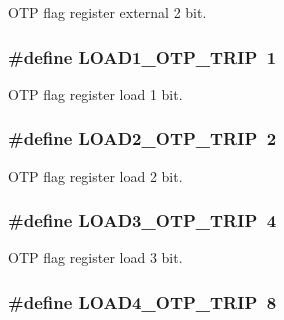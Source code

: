O\-T\-P flag register external 2 bit. \hypertarget{a00034_a720054d07475f46293498641ca147dec}{
\subsubsection[{L\-O\-A\-D1\-\_\-\-O\-T\-P\-\_\-\-T\-R\-I\-P}]{\setlength{\rightskip}{0pt plus 5cm}\#define L\-O\-A\-D1\-\_\-\-O\-T\-P\-\_\-\-T\-R\-I\-P~1}}\label{a00034_a720054d07475f46293498641ca147dec}
O\-T\-P flag register load 1 bit. \hypertarget{a00034_a6a57d6c23509cd22be3a64fc25867f08}{
\subsubsection[{L\-O\-A\-D2\-\_\-\-O\-T\-P\-\_\-\-T\-R\-I\-P}]{\setlength{\rightskip}{0pt plus 5cm}\#define L\-O\-A\-D2\-\_\-\-O\-T\-P\-\_\-\-T\-R\-I\-P~2}}\label{a00034_a6a57d6c23509cd22be3a64fc25867f08}
O\-T\-P flag register load 2 bit. \hypertarget{a00034_a38b67fb04c7a94aea1d7a6cd71dcbdfb}{
\subsubsection[{L\-O\-A\-D3\-\_\-\-O\-T\-P\-\_\-\-T\-R\-I\-P}]{\setlength{\rightskip}{0pt plus 5cm}\#define L\-O\-A\-D3\-\_\-\-O\-T\-P\-\_\-\-T\-R\-I\-P~4}}\label{a00034_a38b67fb04c7a94aea1d7a6cd71dcbdfb}
O\-T\-P flag register load 3 bit. \hypertarget{a00034_a11dc13a3236e2a227537278ccd45390d}{
\subsubsection[{L\-O\-A\-D4\-\_\-\-O\-T\-P\-\_\-\-T\-R\-I\-P}]{\setlength{\rightskip}{0pt plus 5cm}\#define L\-O\-A\-D4\-\_\-\-O\-T\-P\-\_\-\-T\-R\-I\-P~8}}\label{a00034_a11dc13a3236e2a227537278ccd45390d}
